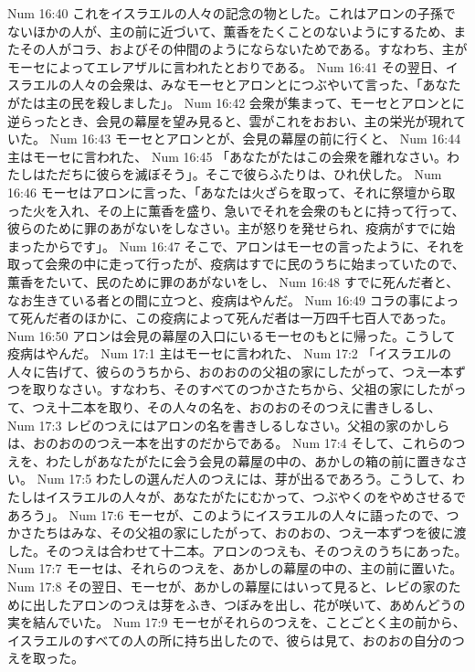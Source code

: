 Num 16:40  これをイスラエルの人々の記念の物とした。これはアロンの子孫でないほかの人が、主の前に近づいて、薫香をたくことのないようにするため、またその人がコラ、およびその仲間のようにならないためである。すなわち、主がモーセによってエレアザルに言われたとおりである。
Num 16:41  その翌日、イスラエルの人々の会衆は、みなモーセとアロンとにつぶやいて言った、「あなたがたは主の民を殺しました」。
Num 16:42  会衆が集まって、モーセとアロンとに逆らったとき、会見の幕屋を望み見ると、雲がこれをおおい、主の栄光が現れていた。
Num 16:43  モーセとアロンとが、会見の幕屋の前に行くと、
Num 16:44  主はモーセに言われた、
Num 16:45  「あなたがたはこの会衆を離れなさい。わたしはただちに彼らを滅ぼそう」。そこで彼らふたりは、ひれ伏した。
Num 16:46  モーセはアロンに言った、「あなたは火ざらを取って、それに祭壇から取った火を入れ、その上に薫香を盛り、急いでそれを会衆のもとに持って行って、彼らのために罪のあがないをしなさい。主が怒りを発せられ、疫病がすでに始まったからです」。
Num 16:47  そこで、アロンはモーセの言ったように、それを取って会衆の中に走って行ったが、疫病はすでに民のうちに始まっていたので、薫香をたいて、民のために罪のあがないをし、
Num 16:48  すでに死んだ者と、なお生きている者との間に立つと、疫病はやんだ。
Num 16:49  コラの事によって死んだ者のほかに、この疫病によって死んだ者は一万四千七百人であった。
Num 16:50  アロンは会見の幕屋の入口にいるモーセのもとに帰った。こうして疫病はやんだ。
Num 17:1  主はモーセに言われた、
Num 17:2  「イスラエルの人々に告げて、彼らのうちから、おのおのの父祖の家にしたがって、つえ一本ずつを取りなさい。すなわち、そのすべてのつかさたちから、父祖の家にしたがって、つえ十二本を取り、その人々の名を、おのおのそのつえに書きしるし、
Num 17:3  レビのつえにはアロンの名を書きしるしなさい。父祖の家のかしらは、おのおののつえ一本を出すのだからである。
Num 17:4  そして、これらのつえを、わたしがあなたがたに会う会見の幕屋の中の、あかしの箱の前に置きなさい。
Num 17:5  わたしの選んだ人のつえには、芽が出るであろう。こうして、わたしはイスラエルの人々が、あなたがたにむかって、つぶやくのをやめさせるであろう」。
Num 17:6  モーセが、このようにイスラエルの人々に語ったので、つかさたちはみな、その父祖の家にしたがって、おのおの、つえ一本ずつを彼に渡した。そのつえは合わせて十二本。アロンのつえも、そのつえのうちにあった。
Num 17:7  モーセは、それらのつえを、あかしの幕屋の中の、主の前に置いた。
Num 17:8  その翌日、モーセが、あかしの幕屋にはいって見ると、レビの家のために出したアロンのつえは芽をふき、つぼみを出し、花が咲いて、あめんどうの実を結んでいた。
Num 17:9  モーセがそれらのつえを、ことごとく主の前から、イスラエルのすべての人の所に持ち出したので、彼らは見て、おのおの自分のつえを取った。
